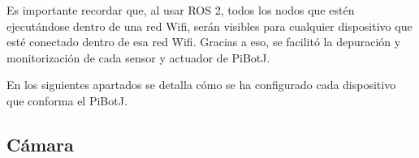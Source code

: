 

Es importante recordar que, al usar ROS 2, todos los nodos que estén ejecutándose dentro de una red Wifi, serán visibles para cualquier dispositivo que esté conectado dentro de esa red Wifi. Gracias a eso, se facilitó la depuración y monitorización de cada sensor y actuador de PiBotJ. 

En los siguientes apartados se detalla cómo se ha configurado cada dispositivo que conforma el PiBotJ. 


\subsection{Cámara}
\label{subsec:configcamara}




